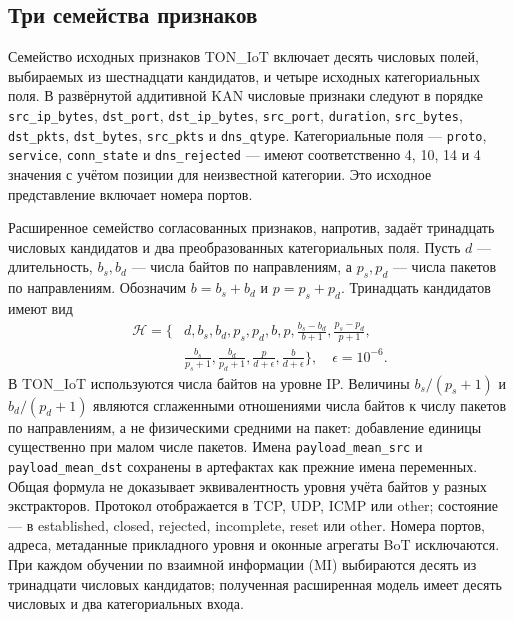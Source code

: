 \subsection{Три семейства признаков}
\label{sec:features}
Семейство исходных признаков TON\_IoT включает десять числовых полей, выбираемых из шестнадцати кандидатов, и четыре исходных категориальных поля. В развёрнутой аддитивной KAN числовые признаки следуют в порядке \texttt{src\_ip\_bytes}, \texttt{dst\_port}, \texttt{dst\_ip\_bytes}, \texttt{src\_port}, \texttt{duration}, \texttt{src\_bytes}, \texttt{dst\_pkts}, \texttt{dst\_bytes}, \texttt{src\_pkts} и \texttt{dns\_qtype}. Категориальные поля --- \texttt{proto}, \texttt{service}, \texttt{conn\_state} и \texttt{dns\_rejected} --- имеют соответственно 4, 10, 14 и 4 значения с учётом позиции для неизвестной категории. Это исходное представление включает номера портов.

Расширенное семейство согласованных признаков, напротив, задаёт тринадцать числовых кандидатов и два преобразованных категориальных поля. Пусть $d$ --- длительность, $b_s,b_d$ --- числа байтов по направлениям, а $p_s,p_d$ --- числа пакетов по направлениям. Обозначим $b=b_s+b_d$ и $p=p_s+p_d$. Тринадцать кандидатов имеют вид
\begin{equation}
\begin{split}
\mathcal H=\bigg\{&d,b_s,b_d,p_s,p_d,b,p,\frac{b_s-b_d}{b+1},\frac{p_s-p_d}{p+1},\\[-2pt]
&\frac{b_s}{p_s+1},\frac{b_d}{p_d+1},\frac{p}{d+\epsilon},\frac{b}{d+\epsilon}\bigg\},
\quad \epsilon=10^{-6}.
\end{split}
\label{eq:harmonized}
\end{equation}
В TON\_IoT используются числа байтов на уровне IP. Величины $b_s/(p_s+1)$ и $b_d/(p_d+1)$ являются сглаженными отношениями числа байтов к числу пакетов по направлениям, а не физическими средними на пакет: добавление единицы существенно при малом числе пакетов. Имена \texttt{payload\_mean\_src} и \texttt{payload\_mean\_dst} сохранены в артефактах как прежние имена переменных. Общая формула не доказывает эквивалентность уровня учёта байтов у разных экстракторов. Протокол отображается в TCP, UDP, ICMP или other; состояние --- в established, closed, rejected, incomplete, reset или other. Номера портов, адреса, метаданные прикладного уровня и оконные агрегаты BoT исключаются. При каждом обучении по взаимной информации (MI) выбираются десять из тринадцати числовых кандидатов; полученная расширенная модель имеет десять числовых и два категориальных входа.

